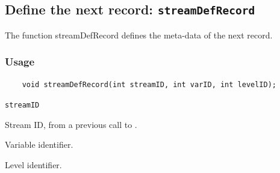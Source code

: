 

\subsection{Define the next record: {\tt streamDefRecord}}
\label{streamDefRecord}

The function streamDefRecord defines the meta-data of the next record.
\subsubsection*{Usage}

\begin{verbatim}
    void streamDefRecord(int streamID, int varID, int levelID);
\end{verbatim}

\hspace*{4mm}\begin{minipage}[]{15cm}
\begin{deflist}{\tt streamID\ }
\item[{\tt streamID}]
Stream ID, from a previous call to {}.
\item[{\tt varID}]
Variable identifier.
\item[{\tt levelID}]
Level identifier.

\end{deflist}
\end{minipage}
